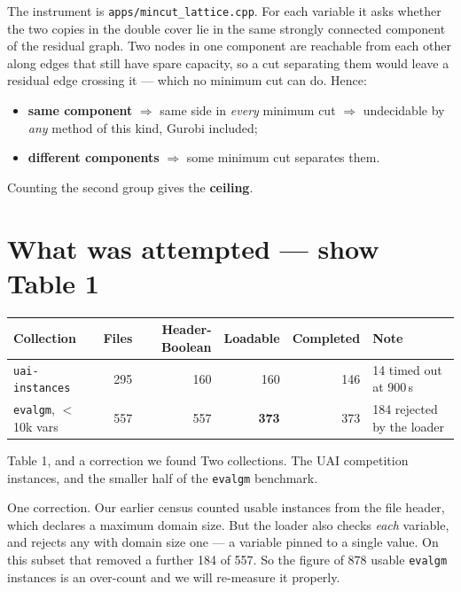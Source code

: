 \documentclass[11pt,a4paper]{article}
\newcommand{\bad}[1]{\textcolor{warnred}{\textbf{#1}}}
\begin{document}
The instrument is \texttt{apps/mincut\_lattice.cpp}. For each variable it asks whether the two
copies in the double cover lie in the same strongly connected component of the residual graph. Two
nodes in one component are reachable from each other along edges that still have spare capacity, so
a cut separating them would leave a residual edge crossing it --- which no minimum cut can do. Hence:

\begin{itemize}[leftmargin=1.4em,itemsep=1pt]
  \item \textbf{same component} $\Rightarrow$ same side in \emph{every} minimum cut $\Rightarrow$
        undecidable by \emph{any} method of this kind, Gurobi included;
  \item \textbf{different components} $\Rightarrow$ some minimum cut separates them.
\end{itemize}

Counting the second group gives the \textbf{ceiling}.

\section{What was attempted --- show Table 1}

\begin{center}
\begin{tabular}{@{}lrrrrl@{}}
\toprule
Collection & Files & Header-Boolean & Loadable & Completed & Note \\
\midrule
\texttt{uai-instances} & 295 & 160 & 160 & 146 & 14 timed out at 900\,s \\
\texttt{evalgm}, $<$10k vars & 557 & 557 & \bad{373} & 373 & 184 rejected by the loader \\
\bottomrule
\end{tabular}
\end{center}

\begin{say}{Table 1, and a correction we found}
Two collections. The UAI competition instances, and the smaller half of the \texttt{evalgm}
benchmark.

One correction. Our earlier census counted usable instances from the file header, which declares a
maximum domain size. But the loader also checks \emph{each} variable, and rejects any with domain
size one --- a variable pinned to a single value. On this subset that removed a further 184 of 557.
So the figure of 878 usable \texttt{evalgm} instances is an over-count and we will re-measure it
properly.
\end{say}
\end{document}
